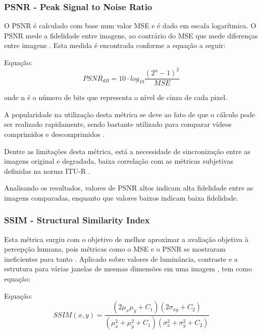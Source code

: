 \subsubsection[PSNR]{PSNR - Peak Signal to Noise Ratio}
O PSNR é calculado com base num valor MSE e é dado em escala logarítmica. O PSNR mede a fidelidade entre imagens, ao contrário do MSE que mede diferenças entre imagens \cite{winkler2005}. Esta medida é encontrada conforme a equação a seguir:

Equação: \[PSNR_{dB} = 10 \cdot log_{10} \frac{{\left(2^{n} -1 \right )}^{2}}{MSE}\]

onde n é o número de bits que representa o nível de cinza de cada pixel.

A popularidade na utilização desta métrica se deve ao fato de que o cálculo pode ser realizado rapidamente, sendo bastante utilizado para comparar vídeos comprimidos e descomprimidos \cite{emmersonsilva, richardson2003}.

Dentre as limitações desta métrica, está a necessidade de sincronização entre as imagens original e degradada, baixa correlação com as métricas subjetivas definidas na norma ITU-R \cite{emmersonsilva, itubt500}.

Analisando os resultados, valores de PSNR altos indicam alta fidelidade entre as imagens comparadas, enquanto que valores baixos indicam baixa fidelidade.

\subsubsection[SSIM]{SSIM - Structural Similarity Index}

Esta métrica surgiu com o objetivo de melhor aproximar a avaliação objetiva à percepção humana, pois métricas como o MSE e o PSNR se mostraram ineficientes para tanto \cite{emmersonsilva}. Aplicado sobre valores de luminância, contraste e a estrutura para várias janelas de mesmas dimensões em uma imagem \cite{wangbovik2004}, tem como equação:

    Equação: \[SSIM(x, y) = \frac{(2\mu_{x}\mu_{y} + C_{1})(2\sigma_{xy} + C_{2})} {(\mu_{x}^{2} + \mu_{y}^{2}+C_{1})(\sigma_{x}^{2} + \sigma_{y}^{2}+C_{2})}\]

